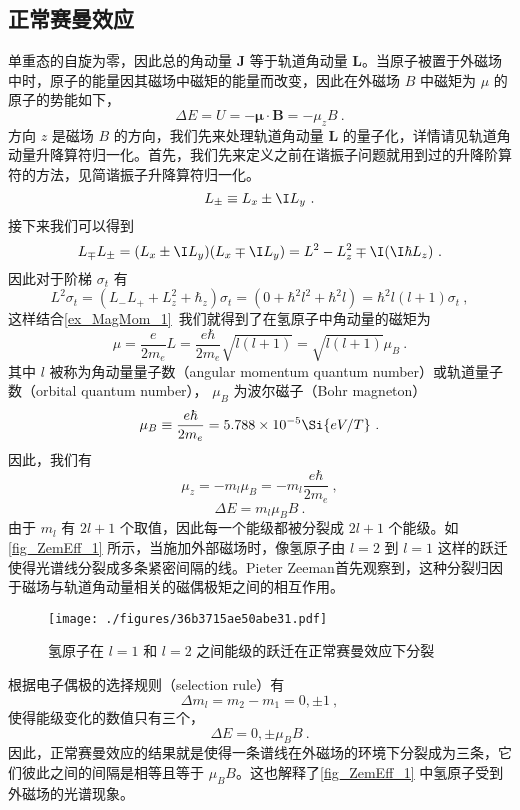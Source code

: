 \subsection{正常赛曼效应}
单重态的自旋为零，因此总的角动量 $\mathbf{J}$ 等于轨道角动量 $\mathbf{L}$。当原子被置于外磁场中时，原子的能量因其磁场中磁矩的能量而改变，因此在外磁场 $B$ 中磁矩为 $\mu$ 的原子的势能如下，
\begin{equation}
\Delta E=U = -\boldsymbol\mu\cdot \mathbf{B}=-\mu_z B~.
\end{equation}
方向 $z$ 是磁场 $B$ 的方向，我们先来处理轨道角动量 $\mathbf{L}$ 的量子化，详情请见轨道角动量升降算符归一化。首先，我们先来定义之前在谐振子问题就用到过的升降阶算符的方法，见简谐振子升降算符归一化。
\begin{equation}
L_{\pm}\equiv L_x \pm \I L_y~.
\end{equation}
接下来我们可以得到
\begin{equation}
L_{\mp}L_{\pm}=(L_x \pm \I L_y)(L_x \mp \I L_y)=L^2-L_z^2\mp \I(\I\hbar L_z)~.
\end{equation}
因此对于阶梯 $\sigma_t$ 有
\begin{equation}
L^2\sigma_t=(L_{-}L_{+}+L^2_z+\hbar_z)\sigma_t=(0+\hbar^2l^2+\hbar^2l)=\hbar^2l(l+1)\sigma_t~,
\end{equation}
这样结合\autoref{ex_MagMom_1}~我们就得到了在氢原子中角动量的磁矩为
$$
\mu=\frac{e}{2m_e}L=\frac{e\hbar}{2m_e}\sqrt{l(l+1)}=\sqrt{l(l+1)}\mu_B~.
$$
其中 $l$ 被称为角动量量子数（angular momentum quantum number）或轨道量子数（orbital quantum number）， $\mu_B$ 为波尔磁子（Bohr magneton）
\begin{equation}
\mu_B\equiv\frac{e\hbar}{2m_e}=5.788\times 10^{-5}\Si{eV/T}~.
\end{equation}
因此，我们有
$$
\mu_z=-m_l\mu_B=-m_l\frac{e\hbar}{2m_e}~,
$$
\begin{equation}
\Delta E = m_l\mu_B B~.
\end{equation}
由于 $m_l$ 有 $2l+1$ 个取值，因此每一个能级都被分裂成 $2l+1$ 个能级。如\autoref{fig_ZemEff_1} 所示，当施加外部磁场时，像氢原子由 $l=2$ 到 $l=1$ 这样的跃迁使得光谱线分裂成多条紧密间隔的线。Pieter Zeeman首先观察到，这种分裂归因于磁场与轨道角动量相关的磁偶极矩之间的相互作用。
\begin{figure}[ht]
\centering
\texttt{[image: ./figures/36b3715ae50abe31.pdf]}
\caption{氢原子在 $l=1$ 和 $l=2$ 之间能级的跃迁在正常赛曼效应下分裂} \label{fig_ZemEff_1}
\end{figure}
根据电子偶极的选择规则（selection rule）有
$$
\Delta m_l = m_2-m_1=0, \pm 1~,
$$
使得能级变化的数值只有三个，
$$
\Delta E = 0,\pm \mu_B B~.
$$
因此，正常赛曼效应的结果就是使得一条谱线在外磁场的环境下分裂成为三条，它们彼此之间的间隔是相等且等于 $\mu_B B$。这也解释了\autoref{fig_ZemEff_1} 中氢原子受到外磁场的光谱现象。
